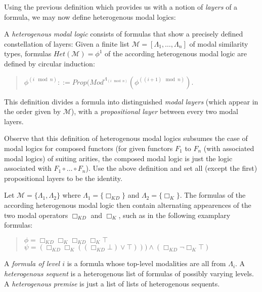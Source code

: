 \documentclass{entcs} \usepackage{entcsmacro}
\begin{document}
Using the previous definition which provides us with a notion of \emph{layers} of a formula,
we may now define heterogenous modal logics:

\begin{definition}
A \emph{heterogenous modal logic} consists of formulas that show a precisely defined constellation
of layers: Given a finite list $\mathcal{M}=[\Lambda_1,\ldots,\Lambda_n]$ of modal similarity
types, formulas $Het(\mathcal{M})=\phi^1$ of the according heterogenous modal logic are defined by circular induction:
\begin{quote}
$\phi^{(i \mod n)}::=Prop(Mod^{\Lambda_{(i\mod n)}}(\phi^{((i+1) \mod n)}).$
\end{quote}
\end{definition}
This definition divides a formula into distinguished \emph{modal layers} (which appear in the
order given by $\mathcal{M}$), with a
\emph{propositional layer} between every two modal layers.
\begin{remark}
Observe that this definition of heterogenous modal logics subsumes the case of modal logics
for composed functors (for given functors $F_1$ to $F_n$ (with associated modal logics)
of suiting arities, the composed modal logic is just the logic associated with
$F_1\circ\ldots\circ F_n$).
Use the above definition and set all (except the first) propositional layers to be the
identity.
\end{remark}

\begin{example}
Let $\mathcal{M}=\{\Lambda_1,\Lambda_2\}$ where $\Lambda_1=\{\Box_{KD}\}$ and
$\Lambda_2=\{\Box_{K}\}$. The formulas of the according heterogenous modal logic
then contain alternating appearences of the two modal operators $\Box_{KD}$ and
$\Box_{K}$, such as in the following examplary formulas:
\begin{quote}
$\phi=\Box_{KD}\Box_{K}\Box_{KD}\Box_{K}\top$\\
$\psi=(\Box_{KD} \Box_{K} ((\Box_{KD} \bot) \vee \top)))\wedge(\Box_{KD}\neg \Box_{K} \top)$
\end{quote}
\end{example}

\begin{definition}
A \emph{formula of level $i$} is a formula whose top-level modalities are all from $\Lambda_i$.
A \emph{heterogenous sequent} is a heterogenous list of formulas of possibly varying levels. 
A \emph{heterogenous premise} is just a list of lists of heterogenous sequents.
\end{definition}
\end{document}
